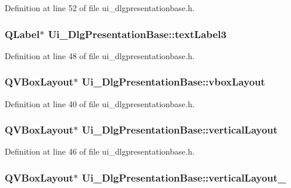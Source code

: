 Definition at line 52 of file ui\+\_\+dlgpresentationbase.\+h.

\hypertarget{classUi__DlgPresentationBase_ae5ef2f22ad09c5290e989c3979c7009f}{
\subsubsection[{text\+Label3}]{\setlength{\rightskip}{0pt plus 5cm}Q\+Label$\ast$ Ui\+\_\+\+Dlg\+Presentation\+Base\+::text\+Label3}}\label{classUi__DlgPresentationBase_ae5ef2f22ad09c5290e989c3979c7009f}


Definition at line 48 of file ui\+\_\+dlgpresentationbase.\+h.

\hypertarget{classUi__DlgPresentationBase_abe419761379b787b35d2508302b75d1b}{
\subsubsection[{vbox\+Layout}]{\setlength{\rightskip}{0pt plus 5cm}Q\+V\+Box\+Layout$\ast$ Ui\+\_\+\+Dlg\+Presentation\+Base\+::vbox\+Layout}}\label{classUi__DlgPresentationBase_abe419761379b787b35d2508302b75d1b}


Definition at line 40 of file ui\+\_\+dlgpresentationbase.\+h.

\hypertarget{classUi__DlgPresentationBase_a950c7e7e9d1c97a83bdce43745d2bb66}{
\subsubsection[{vertical\+Layout}]{\setlength{\rightskip}{0pt plus 5cm}Q\+V\+Box\+Layout$\ast$ Ui\+\_\+\+Dlg\+Presentation\+Base\+::vertical\+Layout}}\label{classUi__DlgPresentationBase_a950c7e7e9d1c97a83bdce43745d2bb66}


Definition at line 46 of file ui\+\_\+dlgpresentationbase.\+h.

\hypertarget{classUi__DlgPresentationBase_a3a84b15d28c24f8e1ae84d6c5c322290}{
\subsubsection[{vertical\+Layout\+\_\+2}]{\setlength{\rightskip}{0pt plus 5cm}Q\+V\+Box\+Layout$\ast$ Ui\+\_\+\+Dlg\+Presentation\+Base\+::vertical\+Layout\+\_}}\label{classUi__DlgPresentationBase_a3a84b15d28c24f8e1ae84d6c5c322290}


